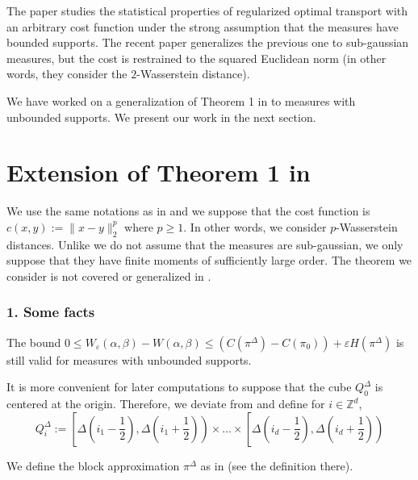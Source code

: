 \documentclass[12pt]{report}
\theoremstyle{definition}
\theoremstyle{remark}
\begin{document}
\par The paper \cite{genevay2018sample} studies the statistical properties of regularized optimal transport with an arbitrary cost function under the strong assumption that the measures have bounded supports. The recent paper \cite{mena2019statistical} generalizes the previous one to sub-gaussian measures, but the cost is restrained to the squared Euclidean norm (in other words, they consider the $2$-Wasserstein distance).

\par We have worked on a generalization of Theorem 1 in \cite{genevay2018sample} to measures with unbounded supports. We present our work in the next section.

\newpage
\section{Extension of Theorem 1 in \cite{genevay2018sample}}

\hspace{\parindent} We use the same notations as in \cite{genevay2018sample} and we suppose that the cost function is $c(x,y):= \|x-y\|_2^p$ where $p\geq 1$. In other words, we consider $p$-Wasserstein distances. Unlike \cite{mena2019statistical} we do not assume that the measures are sub-gaussian, we only suppose that they have finite moments of sufficiently large order. The theorem we consider is not covered or generalized in \cite{mena2019statistical}.

\subsubsection*{1. Some facts}
\hspace{\parindent}The bound $0 \leqslant W_{\varepsilon}(\alpha, \beta)-W(\alpha, \beta) \leqslant\left(C(\pi^{\Delta})-C(\pi_{0})\right)+\varepsilon H(\pi^{\Delta})$ is still valid for measures with unbounded supports. 

It is more convenient for later computations to suppose that the cube $Q_0^\Delta$ is centered at the origin. Therefore, we deviate from \cite{genevay2018sample} and define for $i\in \mathbb Z^d$, $$Q_i^\Delta := \left[\Delta\left(i_1-\frac 12\right), \Delta\left(i_1+\frac 12\right)  \right)\times \ldots \times \left[\Delta\left(i_d-\frac 12\right), \Delta\left(i_d+\frac 12\right)  \right)$$

We define the block approximation $\pi^{\Delta}$ as in \cite{genevay2018sample} (see the definition there).
\end{document}
